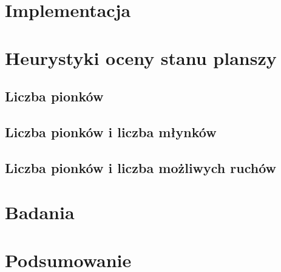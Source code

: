 \documentclass{article}
\begin{document}
	\section{Implementacja}
	\section{Heurystyki oceny stanu planszy}
	\subsection{Liczba pionków}
	\subsection{Liczba pionków i liczba młynków}
	\subsection{Liczba pionków i liczba możliwych ruchów}
	\section{Badania}
	\section{Podsumowanie}
\end{document}
